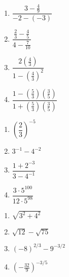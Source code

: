 \documentclass{ximera}
\begin{document}
\begin{multicols}{4}
\begin{enumerate}
\setcounter{enumi}{\value{HW}}

\item  $\dfrac{3 - \frac{4}{9}}{-2 - (-3)}$
\item  $\dfrac{\frac{2}{3} - \frac{4}{5}}{4 - \frac{7}{10}}$
\item  $\dfrac{2\left(\frac{4}{3}\right)}{1 - \left(\frac{4}{3}\right)^2}$
\item  $\dfrac{1 - \left(\frac{5}{3}\right)\left(\frac{3}{5}\right)}{1 + \left(\frac{5}{3}\right)\left(\frac{3}{5}\right)}$

\setcounter{HW}{\value{enumi}}
\end{enumerate}
\end{multicols}

\begin{multicols}{4}
\begin{enumerate}
\setcounter{enumi}{\value{HW}}

\item  $\left(\dfrac{2}{3}\right)^{-5}$
\item  $3^{-1} - 4^{-2}$
\item  $\dfrac{1 + 2^{-3}}{3 - 4^{-1}}$ 
\item  $\dfrac{3\cdot 5^{100}}{12 \cdot 5^{98}}$

\setcounter{HW}{\value{enumi}}
\end{enumerate}
\end{multicols}

\begin{multicols}{4}
\begin{enumerate}
\setcounter{enumi}{\value{HW}}

\item  $\sqrt{3^2 + 4^2}$  
\item  $\sqrt{12} - \sqrt{75}$  
\item  $(-8)^{2/3} - 9^{-3/2}$ 
\item  $\left(-\frac{32}{9}\right)^{-3/5}$

\setcounter{HW}{\value{enumi}}
\end{enumerate}
\end{multicols}
\end{document}
